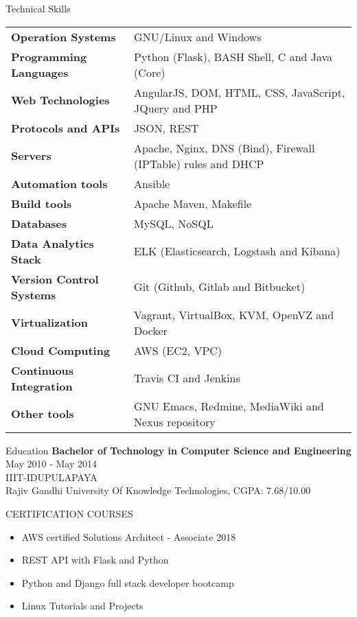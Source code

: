 \documentclass{resume} %
\begin{document}
\begin{rSection}
  {Technical Skills}

  \begin{tabular}{ @{} >{\bfseries}l @{\hspace{2ex}} l }
    Operation Systems & GNU/Linux and Windows \\
    Programming Languages & Python (Flask), BASH Shell, C and Java (Core)
    \\ Web Technologies & AngularJS, DOM, HTML, CSS,
    JavaScript, JQuery and PHP\\ Protocols and
    APIs & JSON, REST \\ Servers
    & Apache, Nginx, DNS (Bind), Firewall (IPTable) rules
    and DHCP \\ Automation tools & Ansible \\
    Build tools & Apache Maven, Makefile
    \\ Databases & MySQL, NoSQL \\ Data Analytics Stack &
    ELK (Elasticsearch, Logstash and Kibana) \\
    Version Control Systems & Git (Github, Gitlab and
    Bitbucket) \\ Virtualization & Vagrant, VirtualBox, KVM,
    OpenVZ and Docker \\ Cloud Computing & AWS (EC2, VPC)
    \\ Continuous Integration & Travis CI and Jenkins \\ Other
    tools & GNU Emacs, Redmine, MediaWiki and Nexus repository
    
  \end{tabular}

\end{rSection}



\begin{rSection}{Education}
  {\bf Bachelor of Technology in Computer Science and Engineering} \hfill {May 2010 - May 2014}
  \\ 
  IIIT-IDUPULAPAYA
  \\
  Rajiv Gandhi University Of Knowledge Technologies,  CGPA: 7.68/10.00  
  

\end{rSection}

\begin{rSection}{CERTIFICATION COURSES}
  \begin{itemize}
  \item AWS certified Solutions Architect - Associate 2018 
  \item REST API with Flask and Python
  \item Python and Django full stack developer bootcamp
  \item Linux Tutorials and Projects
    
  \end{itemize}

\end{rSection}
\end{document}
